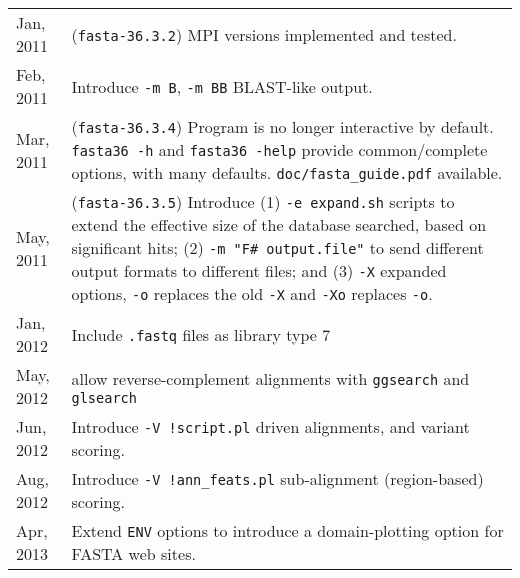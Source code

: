 \begin{longtable}{p{0.75 in}p{5.25 in}}
Jan, 2011 & (\texttt{fasta-36.3.2}) MPI versions implemented and tested.\\[1ex]

Feb, 2011 & Introduce \texttt{-m B}, \texttt{-m BB} BLAST-like output.\\[1.0ex]

Mar, 2011 & (\texttt{fasta-36.3.4}) Program is no longer interactive by
default. \texttt{fasta36 -h} and \texttt{fasta36 -help} provide
common/complete options, with many defaults. \texttt{doc/fasta\_guide.pdf} available.\\[1.0ex]

May, 2011 & (\texttt{fasta-36.3.5}) Introduce (1) \texttt{-e
  expand.sh} scripts to extend the effective size of the database
searched, based on significant hits; (2) \texttt{-m "F\# output.file"}
to send different output formats to different files; and (3)
\texttt{-X} expanded options, \texttt{-o} replaces the old \texttt{-X}
and \texttt{-Xo} replaces \texttt{-o}. \\[1.0ex]

Jan, 2012 & Include \texttt{.fastq} files as library type 7 \\[1.0ex]

May, 2012 & allow reverse-complement alignments with \texttt{ggsearch} and \texttt{glsearch} \\[1.0ex]

Jun, 2012 & Introduce \texttt{-V !script.pl} driven alignments, and variant scoring.\\[1.0ex]

Aug, 2012 & Introduce \texttt{-V !ann\_feats.pl} sub-alignment (region-based) scoring.\\[1.0ex]

Apr, 2013 & Extend \texttt{ENV} options to introduce a domain-plotting option for FASTA web sites.\\[1.0ex]

\hline
\end{longtable}
